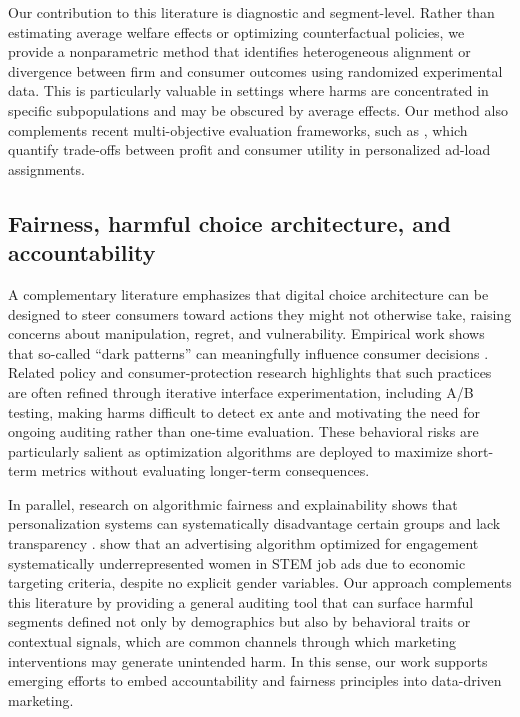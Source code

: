 \documentclass[11pt,letterpaper,english]{article}
\theoremstyle{definition}
\theoremstyle{definition}
\begin{document}
\begin{bibunit}
Our contribution to this literature is diagnostic and segment-level. Rather than estimating average welfare effects or optimizing counterfactual policies, we provide a nonparametric method that identifies heterogeneous alignment or divergence between firm and consumer outcomes using randomized experimental data. This is particularly valuable in settings where harms are concentrated in specific subpopulations and may be obscured by average effects. Our method also complements recent multi-objective evaluation frameworks, such as \citet{goli2025personalizing}, which quantify trade-offs between profit and consumer utility in personalized ad-load assignments.

\subsection{Fairness, harmful choice architecture, and accountability}
A complementary literature emphasizes that digital choice architecture can be designed to steer consumers toward actions they might not otherwise take, raising concerns about manipulation, regret, and vulnerability. Empirical work shows that so-called ``dark patterns'' can meaningfully influence consumer decisions \citep{luguri2021shining}. Related policy and consumer-protection research highlights that such practices are often refined through iterative interface experimentation, including A/B testing, making harms difficult to detect ex ante and motivating the need for ongoing auditing rather than one-time evaluation. These behavioral risks are particularly salient as optimization algorithms are deployed to maximize short-term metrics without evaluating longer-term consequences.

In parallel, research on algorithmic fairness and explainability shows that personalization systems can systematically disadvantage certain groups and lack transparency \citep{lambrecht2019algorithmic, rai2020explainable}. \citet{lambrecht2019algorithmic} show that an advertising algorithm optimized for engagement systematically underrepresented women in STEM job ads due to economic targeting criteria, despite no explicit gender variables. Our approach complements this literature by providing a general auditing tool that can surface harmful segments defined not only by demographics but also by behavioral traits or contextual signals, which are common channels through which marketing interventions may generate unintended harm. In this sense, our work supports emerging efforts to embed accountability and fairness principles into data-driven marketing.


\end{bibunit}
\end{document}
